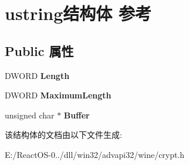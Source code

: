 \hypertarget{structustring}{}\section{ustring结构体 参考}
\label{structustring}
\subsection*{Public 属性}
\begin{DoxyCompactItemize}
\item 
\mbox{\label{structustring_a195c48595ee7ac48e6475f7a7a387781}} 
D\+W\+O\+RD {\bfseries Length}
\item 
\mbox{\label{structustring_a725f666fcc6c64081d99df9b141f1821}} 
D\+W\+O\+RD {\bfseries Maximum\+Length}
\item 
\mbox{\label{structustring_aef977ff9b5ea5157c912fd8ce32fa33d}} 
unsigned char $\ast$ {\bfseries Buffer}
\end{DoxyCompactItemize}


该结构体的文档由以下文件生成\+:\begin{DoxyCompactItemize}
\item 
E\+:/\+React\+O\+S-\/0../dll/win32/advapi32/wine/crypt.\+h\end{DoxyCompactItemize}
